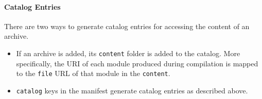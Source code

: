 \paragraph{Catalog Entries}
There are two ways to generate catalog entries for accessing the content of an archive.
\begin{itemize}
 \item If an archive is added, its \texttt{content} folder is added to the catalog. More specifically, the URI of each module produced during compilation is mapped to the \texttt{file} URL of that module in the \texttt{content}.
 \item \texttt{catalog} keys in the manifest generate catalog entries as described above.
\end{itemize}
